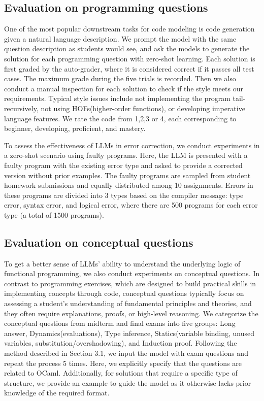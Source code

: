 \subsection{Evaluation on programming questions}


One of the most popular downstream tasks for code modeling is code generation given a natural language description. We prompt the model with the same question description as students would see, and ask the models to generate the solution for each programming question with zero-shot learning. Each solution is first graded by the auto-grader, where it is considered correct if it passes all test cases. The maximum grade during the five trials is recorded. Then we also conduct a manual inspection for each solution to check if the style meets our requirements. Typical style issues include not implementing the program tail-recursively, not using HOFs(higher-order functions), or developing imperative language features. We rate the code from 1,2,3 or 4, each corresponding to beginner, developing, proficient, and mastery.

To assess the effectiveness of LLMs in error correction, we conduct experiments in a zero-shot scenario using faulty programs. Here, the LLM is presented with a faulty program with the existing error type and asked to provide a corrected version without prior examples. The faulty programs are sampled from student homework submissions and equally distributed among 10 assignments. Errors in these programs are divided into 3 types based on the compiler message: type error, syntax error, and logical error, where there are 500 programs for each error type (a total of 1500 programs). 

\subsection{Evaluation on conceptual questions}

To get a better sense of LLMs' ability to understand the underlying logic of functional programming, we also conduct experiments on conceptual questions. In contrast to programming exercises, which are designed to build practical skills in implementing concepts through code, conceptual questions typically focus on assessing a student's understanding of fundamental principles and theories, and they often require explanations, proofs, or high-level reasoning. We categorize the conceptual questions from midterm and final exams into five groups: Long answer, Dynamics(evaluations), Type inference, Statics(variable binding, unused variables, substitution/overshadowing), and Induction proof. Following the method described in Section 3.1, we input the model with exam questions and repeat the process 5 times. Here, we explicitly specify that the questions are related to OCaml. Additionally, for solutions that require a specific type of structure, we provide an example to guide the model as it otherwise lacks prior knowledge of the required format. 




